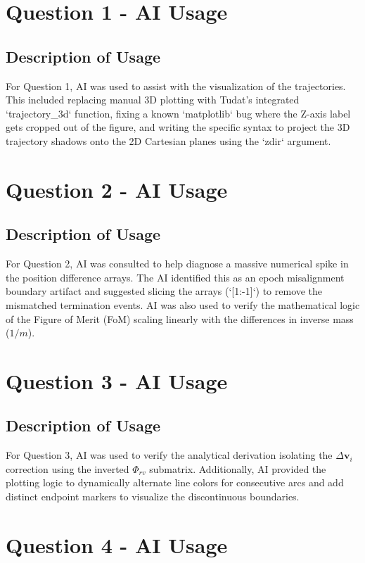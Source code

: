 \documentclass[a4paper,12pt]{article}
\begin{document}
\section*{Question 1 - AI Usage}

\subsection*{Description of Usage}
For Question 1, AI was used to assist with the visualization of the trajectories. This included replacing manual 3D plotting with Tudat's integrated `trajectory_3d` function, fixing a known `matplotlib` bug where the Z-axis label gets cropped out of the figure, and writing the specific syntax to project the 3D trajectory shadows onto the 2D Cartesian planes using the `zdir` argument.

\section*{Question 2 - AI Usage}

\subsection*{Description of Usage}
For Question 2, AI was consulted to help diagnose a massive numerical spike in the position difference arrays. The AI identified this as an epoch misalignment boundary artifact and suggested slicing the arrays (`[1:-1]`) to remove the mismatched termination events. AI was also used to verify the mathematical logic of the Figure of Merit (FoM) scaling linearly with the differences in inverse mass ($1/m$).

\section*{Question 3 - AI Usage}

\subsection*{Description of Usage}
For Question 3, AI was used to verify the analytical derivation isolating the $\Delta \mathbf{v}_i$ correction using the inverted $\Phi_{rv}$ submatrix. Additionally, AI provided the plotting logic to dynamically alternate line colors for consecutive arcs and add distinct endpoint markers to visualize the discontinuous boundaries.

\section*{Question 4 - AI Usage}
\end{document}
